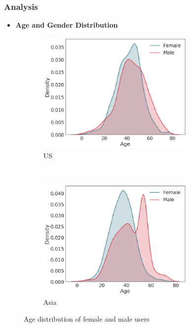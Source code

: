 \documentclass{beamer}
\begin{document}
\begin{frame}
\frametitle{Analysis}
\begin{itemize}
\item \textbf{Age and Gender Distribution}\pause
\end{itemize}
\begin{figure}[h]
\centering
\begin{subfigure}{0.45\textwidth}
\includegraphics[width=0.85\textwidth]{SS1}
\caption{US}
\end{subfigure} \pause
~
\begin{subfigure}{0.45\textwidth}
\includegraphics[width=0.85\textwidth]{SS2}
\caption{Asia}
\end{subfigure}
\caption{Age distribution of female and male users}
\end{figure}

\end{frame}
\end{document}
